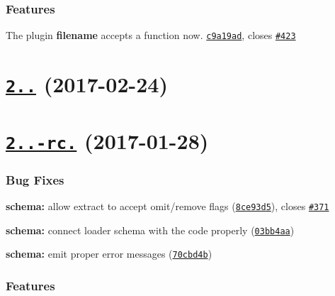 \subsubsection*{Features}


\begin{DoxyItemize}
\item The plugin {\bfseries filename} accepts a function now. \href{https://github.com/webpack-contrib/extract-text-webpack-plugin/commit/c9a19ad}{\tt c9a19ad}, closes \href{https://github.com/webpack-contrib/extract-text-webpack-plugin/pull/423}{\tt \#423}
\end{DoxyItemize}

\label{_2.0.0}%
 \section*{\href{https://github.com/webpack/extract-text-webpack-plugin/compare/v2.0.0-rc.3...v2.0.0}{\tt 2..} (2017-\/02-\/24)}

\label{_2.0.0-rc.2}%
 \section*{\href{https://github.com/webpack/extract-text-webpack-plugin/compare/v2.0.0-rc.1...v2.0.0-rc.2}{\tt 2..-\/rc.} (2017-\/01-\/28)}

\subsubsection*{Bug Fixes}


\begin{DoxyItemize}
\item {\bfseries schema\+:} allow {\ttfamily extract} to accept omit/remove flags (\href{https://github.com/webpack/extract-text-webpack-plugin/commit/8ce93d5}{\tt 8ce93d5}), closes \href{https://github.com/webpack/extract-text-webpack-plugin/issues/371}{\tt \#371}
\item {\bfseries schema\+:} connect loader schema with the code properly (\href{https://github.com/webpack/extract-text-webpack-plugin/commit/03bb4aa}{\tt 03bb4aa})
\item {\bfseries schema\+:} emit proper error messages (\href{https://github.com/webpack/extract-text-webpack-plugin/commit/70cbd4b}{\tt 70cbd4b})
\end{DoxyItemize}

\subsubsection*{Features}


